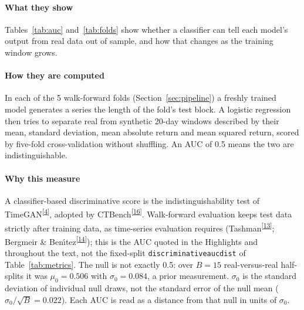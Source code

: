 \documentclass[11pt,a4paper]{article}
\makeatletter
\newcommand{\tcite}[1]{\textsuperscript{[\hyperlink{R:#1}{#1}]}}
\DeclareRobustCommand{\_}{\ifmmode\nfss@text{\textunderscore}\else\textunderscore\allowbreak\fi}
\makeatother
\begin{document}
\paragraph{What they show} Tables~\ref{tab:auc} and~\ref{tab:folds} show whether a classifier can tell each model's output from real data out of sample, and how that changes as the training window grows.

\paragraph{How they are computed} In each of the 5 walk-forward folds (Section~\ref{sec:pipeline}) a freshly trained model generates a series the length of the fold's test block. A logistic regression then tries to separate real from synthetic 20-day windows described by their mean, standard deviation, mean absolute return and mean squared return, scored by five-fold cross-validation without shuffling. An AUC of 0.5 means the two are indistinguishable.

\paragraph{Why this measure} A classifier-based discriminative score is the indistinguishability test of TimeGAN\tcite{4}, adopted by CTBench\tcite{16}. Walk-forward evaluation keeps test data strictly after training data, as time-series evaluation requires (Tashman\tcite{13}; Bergmeir \& Ben\'{\i}tez\tcite{14}); this is the AUC quoted in the Highlights and throughout the text, not the fixed-split \texttt{discriminative\_auc\_dist} of Table~\ref{tab:metrics}. The null is not exactly 0.5: over $B=15$ real-versus-real half-splits it was $\mu_0=0.506$ with $\sigma_0=0.084$, a prior measurement. $\sigma_0$ is the standard deviation of individual null draws, not the standard error of the null mean ($\sigma_0/\sqrt{B}=0.022$). Each AUC is read as a distance from that null in units of $\sigma_0$.
\end{document}
